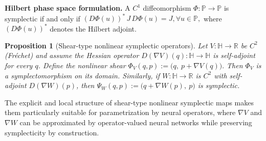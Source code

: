 \documentclass{article}
\theoremstyle{plain}
\newtheorem{proposition}[theorem]{Proposition}
\theoremstyle{definition}
\theoremstyle{remark}
\newcommand{\bbH}{\mathbb{H}}
\newcommand{\bbP}{\mathbb{P}}
\begin{document}
\textbf{Hilbert phase space formulation.}
A $C^1$ diffeomorphism $\Phi:\bbP\to\bbP$ is symplectic if and only if
\(
(D\Phi(u))^*\, J\, D\Phi(u) = J, 
\forall u\in\bbP,
\)
where $(D\Phi(u))^*$ denotes the Hilbert adjoint.
\begin{proposition}[Shear-type nonlinear symplectic operators]
\label{prop:nonlinear-shear}
Let $V:\bbH\to\mathbb{R}$ be $C^2$ (Fr\'echet) and assume the Hessian operator
$D(\nabla V)(q):\bbH\to\bbH$ is self-adjoint for every $q$.
Define the nonlinear shear
\(
\Phi_V(q,p):=\big(q,\ p + \nabla V(q)\big).
\)
Then $\Phi_V$ is a symplectomorphism on its domain.
Similarly, if $W:\bbH\to\mathbb{R}$ is $C^2$ with self-adjoint $D(\nabla W)(p)$, then
\(
\Psi_W(q,p):=\big(q+\nabla W(p),\ p\big)
\)
is symplectic.
\end{proposition}
The explicit and local structure of shear-type nonlinear symplectic maps makes
them particularly suitable for parametrization by neural operators, where
$\nabla V$ and $\nabla W$ can be approximated by operator-valued neural networks
while preserving symplecticity by construction.
\end{document}
